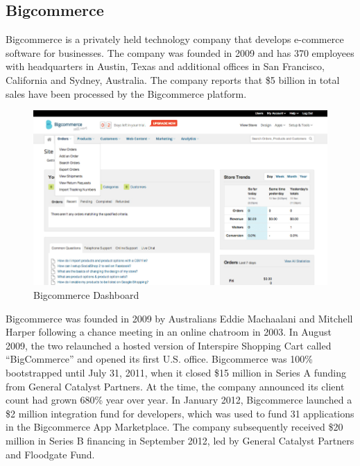 \subsection{Bigcommerce}
Bigcommerce is a privately held technology company that develops e-commerce software for businesses. The company was founded in 2009 and has 370 employees with headquarters in Austin, Texas and additional offices in San Francisco, California and Sydney, Australia.
The company reports that \$5 billion in total sales have been processed by the Bigcommerce platform.
\begin{figure}[htb]
 \centering
 \includegraphics[width=1.0\linewidth]{images/chapter1/ex-bigcommerce.jpg}\hfill
 \caption[Bigcommerce Dashboard]{Bigcommerce Dashboard}
 \label{fig:bigcommerce_dashboard}
\end{figure}
Bigcommerce was founded in 2009 by Australians Eddie Machaalani and Mitchell Harper following a chance meeting in an online chatroom in 2003. In August 2009, the two relaunched a hosted version of Interspire Shopping Cart called “BigCommerce” and opened its first U.S. office.
\newline
Bigcommerce was 100\% bootstrapped until July 31, 2011, when it closed \$15 million in Series A funding from General Catalyst Partners. At the time, the company announced its client count had grown 680\% year over year.
\newline
In January 2012, Bigcommerce launched a \$2 million integration fund for developers, which was used to fund 31 applications in the Bigcommerce App Marketplace. The company subsequently received \$20 million in Series B financing in September 2012, led by General Catalyst Partners and Floodgate Fund.